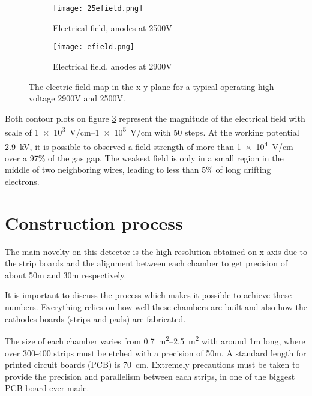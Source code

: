 \begin{figure}[ht]
		\centering
		\hspace*{\fill}
		\begin{subfigure}[b]{0.45\textwidth}
			\centering
			\texttt{[image: 25efield.png]}
			\caption{Electrical field, anodes at 2500V}\label{fig:25efield}
		\end{subfigure}
		\hfill
		\begin{subfigure}[b]{0.45\textwidth}
			\centering
			\texttt{[image: efield.png]}
			\caption{Electrical field, anodes at 2900V}\label{fig:efield}
		\end{subfigure}
		\hspace*{\fill}
		\centering
		\captionsetup{margin=1cm}
		\caption{The electric field map in the x-y plane for a typical operating high voltage 2900V and 2500V.}\label{fig:efields}
\end{figure}

Both contour plots on figure \ref{fig:efields} represent the magnitude of the electrical field with scale of
\SIrange{1e3}{1e5}{V/cm} with 50 steps. At the working potential \SI{2.9}{kV}, it is possible to observed a field
strength of  more than \SI{1e4}{V/cm} over a 97\% of the gas gap. The weakest field is only in a small region in the
middle of two neighboring wires, leading to less than 5\% of long drifting electrons. 


\section{Construction process}

The main novelty on this detector is the high resolution obtained on x-axis due to the strip boards and the alignment
between each chamber to get precision of about 50\micro m and 30\micro m respectively.\par 

It is important to discuss the process which makes it possible to achieve these numbers. Everything relies on how well
these chambers are built and also how the cathodes
boards (strips and pads) are fabricated.\par 

The size of each chamber varies from \SIrange{0.7}{2.5}{m^2} with around 1m long, where over 300-400 strips must be
etched with a precision of 50\micro m. A standard length for printed circuit boards (PCB) is \SI{70}{cm}.  Extremely
precautions must be taken to provide the precision and parallelism between each strips, in one of the biggest PCB board
ever made.\par

